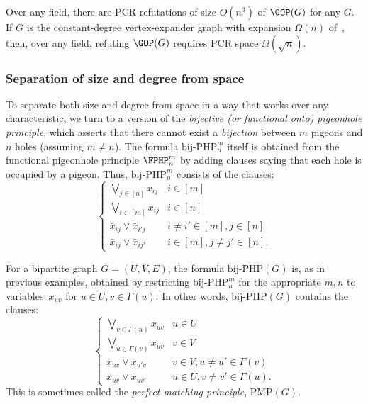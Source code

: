 \begin{theorem}
Over any field, there are PCR refutations of size $O(n^{3})$ of $\GOP(G)$ for any $G$. If  $G$ is the constant-degree vertex-expander graph with 
expansion $\Omega(n)$ of~\cite{DBLP:journals/tocl/GalesiL10}, then, over any field, refuting $\GOP(G)$ requires PCR space $\Omega(\sqrt{n})$. 
\end{theorem}


\subsubsection{ Separation of size and degree from space}


To separate both size and degree from space in a way that works over any characteristic, we turn to a version
of the \emph{bijective  (or functional onto) pigeonhole principle}, which asserts that there cannot exist a \emph{bijection}
between $m$ pigeons and $n$ holes (assuming $m \neq n$). The formula $\mathrm{bij}$-$\mathrm{PHP}^{m}_n$
itself is obtained from the functional pigeonhole principle $\FPHP^m_n$ by adding clauses saying that
each hole is occupied by a pigeon. Thus, $\mathrm{bij}$-$\mathrm{PHP}^{m}_n$ consists of the clauses:
$$\left \{
\begin{array}{ll}
\bigvee_{j\in[n]}x_{ij}  & i \in [m]   \\
\bigvee_{i\in[m]}x_{ij}  & i \in [n] \\
\bar x_{ij} \vee \bar x_{i'j}  & i \not = i' \in [m],  j\in[n] \\
\bar x_{ij} \vee \bar x_{ij'}& i \in [m],  j \not = j'\in[n].
\end{array}
\right.
$$

For a bipartite graph $G=(U,V,E)$, the formula $\mathrm{bij}$-$\mathrm{PHP}(G)$ 
is, as in previous examples, obtained by restricting $\mathrm{bij}$-$\mathrm{PHP}^{m}_{n}$ 
for the appropriate $m,n$ to variables~$x_{uv}$ for $u\in U, v \in \Gamma(u)$.
In other words, $\mathrm{bij}$-$\mathrm{PHP}(G)$ contains the clauses: 
\[
\left \{
\begin{array}{ll}
\bigvee_{v\in\Gamma(u)}x_{uv}  & u \in U   \\
\bigvee_{u\in\Gamma(v)}x_{uv}  & v \in V   \\
\bar x_{uv} \vee \bar x_{u'v}  & v\in V,u \not = u' \in \Gamma(v) \\
\bar x_{uv} \vee \bar x_{uv'}&  u \in U,  v \not = v'\in \Gamma(u).
\end{array}
\right.
\]
This is sometimes called the \emph{perfect matching principle},
$\mathrm{PMP}(G)$.

